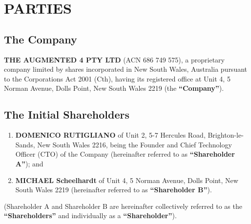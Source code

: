 \section{PARTIES}

\subsection{The Company}
\textbf{THE AUGMENTED 4 PTY LTD} (ACN 686 749 575), a proprietary company limited by shares incorporated in New South Wales, Australia pursuant to the Corporations Act 2001 (Cth), having its registered office at Unit 4, 5 Norman Avenue, Dolls Point, New South Wales 2219 (the \textbf{``Company''}).

\subsection{The Initial Shareholders}
\begin{enumerate}[label=(\alph*)]
\item \textbf{DOMENICO RUTIGLIANO} of Unit 2, 5-7 Hercules Road, Brighton-le-Sands, New South Wales 2216, being the Founder and Chief Technology Officer (CTO) of the Company (hereinafter referred to as \textbf{``Shareholder A''}); and

\item \textbf{MICHAEL Scheelhardt} of Unit 4, 5 Norman Avenue, Dolls Point, New South Wales 2219 (hereinafter referred to as \textbf{``Shareholder B''}).
\end{enumerate}

(Shareholder A and Shareholder B are hereinafter collectively referred to as the \textbf{``Shareholders''} and individually as a \textbf{``Shareholder''}). 